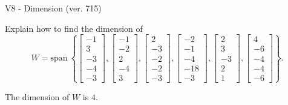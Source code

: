 \begin{exercise}
  \begin{exerciseTitle}V8 - Dimension (ver. 715)\end{exerciseTitle}
  \begin{exerciseStatement}
    Explain how to find the dimension of 
\[W=\mathrm{span}\ \left\{\left[\begin{array}{r}
-1 \\
3 \\
-3 \\
-4 \\
-3
\end{array}\right] , \left[\begin{array}{r}
-1 \\
-2 \\
2 \\
-4 \\
3
\end{array}\right] , \left[\begin{array}{r}
2 \\
-3 \\
-2 \\
-2 \\
-3
\end{array}\right] , \left[\begin{array}{r}
-2 \\
-1 \\
-4 \\
-18 \\
-3
\end{array}\right] , \left[\begin{array}{r}
2 \\
3 \\
-3 \\
2 \\
1
\end{array}\right] , \left[\begin{array}{r}
4 \\
-6 \\
-4 \\
-4 \\
-6
\end{array}\right]\right\}.\]



  \end{exerciseStatement}
  \begin{exerciseAnswer}
   The dimension of \(W\) is  \(4\).
  


  \end{exerciseAnswer}
\end{exercise}